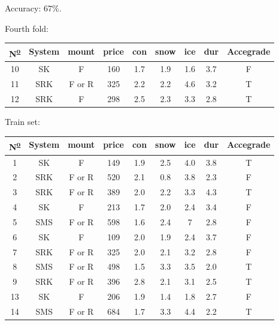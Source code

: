 \documentclass[12pt]{report}
\begin{document}
\begin{solution}
\begin{enumerate}
      Accuracy: $67\%$.
      \par 
      Fourth fold:
      \begin{table}[H]
        \centering
        \begin{tabular}{|c|c|c|c|c|c|c|c|c|}
        \hline
        N\textsuperscript{\underline{o}} & System & mount  & price & con & snow & ice & dur & Accegrade \\ \hline
        10 & SK     & F      & 160   & 1.7 & 1.9  & 1.6 & 3.7 & F         \\ \hline
        11 & SRK    & F or R & 325   & 2.2 & 2.2  & 4.6 & 3.2 & T         \\ \hline
        12 & SRK    & F      & 298   & 2.5 & 2.3  & 3.3 & 2.8 & T         \\ \hline
        \end{tabular}
        \end{table}
      Train set:
      \begin{table}[H]
        \centering
        \begin{tabular}{|c|c|c|c|c|c|c|c|c|}
        \hline
        N\textsuperscript{\underline{o}} & System & mount  & price & con & snow & ice & dur & Accegrade \\ \hline
        1  & SK     & F      & 149   & 1.9 & 2.5  & 4.0 & 3.8 & T         \\ \hline
        2  & SRK    & F or R & 520   & 2.1 & 0.8  & 3.8 & 2.3 & F         \\ \hline
        3  & SRK    & F or R & 389   & 2.0 & 2.2  & 3.3 & 4.3 & T         \\ \hline
        4  & SK     & F      & 213   & 1.7 & 2.0  & 2.4 & 3.4 & F         \\ \hline
        5  & SMS    & F or R & 598   & 1.6 & 2.4  & 7   & 2.8 & F         \\ \hline
        6  & SK     & F      & 109   & 2.0 & 1.9  & 2.4 & 3.7 & F         \\ \hline
        7  & SRK    & F or R & 325   & 2.0 & 2.1  & 3.2 & 2.8 & F         \\ \hline
        8  & SMS    & F or R & 498   & 1.5 & 3.3  & 3.5 & 2.0 & T         \\ \hline
        9  & SRK    & F or R & 396   & 2.8 & 2.1  & 3.1 & 2.5 & T         \\ \hline
        13 & SK     & F      & 206   & 1.9 & 1.4  & 1.8 & 2.7 & F         \\ \hline
        14 & SMS    & F or R & 684   & 1.7 & 3.3  & 4.4 & 2.2 & T         \\ \hline

\end{tabular}
\end{table}
\end{enumerate}
\end{solution}
\end{document}
